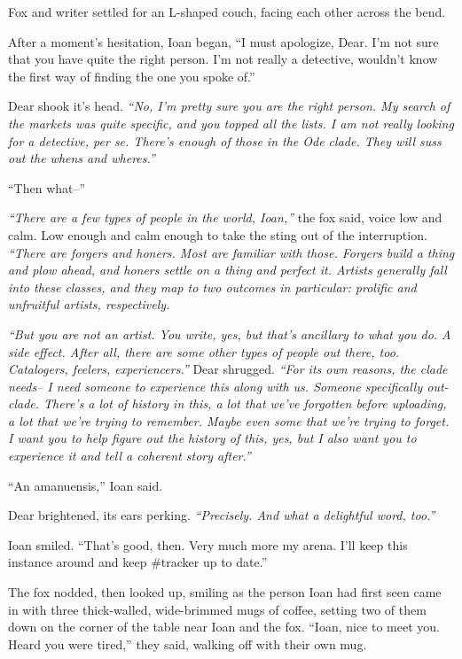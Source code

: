 Fox and writer settled for an L-shaped couch, facing each other across the bend.

After a moment's hesitation, Ioan began, ``I must apologize, Dear. I'm not sure that you have quite the right person. I'm not really a detective, wouldn't know the first way of finding the one you spoke of.''

Dear shook it's head. \emph{``No, I'm pretty sure you are the right person. My search of the markets was quite specific, and you topped all the lists. I am not really looking for a detective, per se. There's enough of those in the Ode clade. They will suss out the whens and wheres.''}

``Then what--''

\emph{``There are a few types of people in the world, Ioan,''} the fox said, voice low and calm. Low enough and calm enough to take the sting out of the interruption. \emph{``There are forgers and honers. Most are familiar with those. Forgers build a thing and plow ahead, and honers settle on a thing and perfect it. Artists generally fall into these classes, and they map to two outcomes in particular: prolific and unfruitful artists, respectively.}

\emph{``But you are not an artist. You write, yes, but that's ancillary to what you do. A side effect. After all, there are some other types of people out there, too. Catalogers, feelers, experiencers.''} Dear shrugged. \emph{``For its own reasons, the clade needs-- I need someone to experience this along with us. Someone specifically out-clade. There's a lot of history in this, a lot that we've forgotten before uploading, a lot that we're trying to remember. Maybe even some that we're trying to forget. I want you to help figure out the history of this, yes, but I also want you to experience it and tell a coherent story after.''}

``An amanuensis,'' Ioan said.

Dear brightened, its ears perking. \emph{``Precisely. And what a delightful word, too.''}

Ioan smiled. ``That's good, then. Very much more my arena. I'll keep this instance around and keep \#tracker up to date.''

The fox nodded, then looked up, smiling as the person Ioan had first seen came in with three thick-walled, wide-brimmed mugs of coffee, setting two of them down on the corner of the table near Ioan and the fox. ``Ioan, nice to meet you. Heard you were tired,'' they said, walking off with their own mug.

